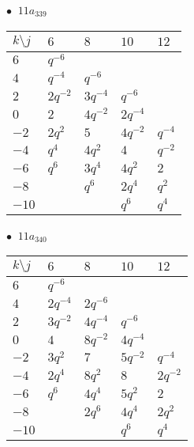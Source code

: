 \begin{minipage}{\linewidth}
$\bullet\ $ $11a_{339}$ \vspace{0.5em} \\
\begin{tabular}{l|llll}
$k \setminus j$ & $6$ & $8$ & $10$ & $12$ \\
\hline
$6$ & $q^{-6}$ &  &  &  \\
$4$ & $q^{-4}$ & $q^{-6}$ &  &  \\
$2$ & $2q^{-2}$ & $3q^{-4}$ & $q^{-6}$ &  \\
$0$ & $2$ & $4q^{-2}$ & $2q^{-4}$ &  \\
$-2$ & $2q^{2}$ & $5$ & $4q^{-2}$ & $q^{-4}$ \\
$-4$ & $q^{4}$ & $4q^{2}$ & $4$ & $q^{-2}$ \\
$-6$ & $q^{6}$ & $3q^{4}$ & $4q^{2}$ & $2$ \\
$-8$ &  & $q^{6}$ & $2q^{4}$ & $q^{2}$ \\
$-10$ &  &  & $q^{6}$ & $q^{4}$ \\
\end{tabular}
\vspace{2em}
\end{minipage}
%
\begin{minipage}{\linewidth}
$\bullet\ $ $11a_{340}$ \vspace{0.5em} \\
\begin{tabular}{l|llll}
$k \setminus j$ & $6$ & $8$ & $10$ & $12$ \\
\hline
$6$ & $q^{-6}$ &  &  &  \\
$4$ & $2q^{-4}$ & $2q^{-6}$ &  &  \\
$2$ & $3q^{-2}$ & $4q^{-4}$ & $q^{-6}$ &  \\
$0$ & $4$ & $8q^{-2}$ & $4q^{-4}$ &  \\
$-2$ & $3q^{2}$ & $7$ & $5q^{-2}$ & $q^{-4}$ \\
$-4$ & $2q^{4}$ & $8q^{2}$ & $8$ & $2q^{-2}$ \\
$-6$ & $q^{6}$ & $4q^{4}$ & $5q^{2}$ & $2$ \\
$-8$ &  & $2q^{6}$ & $4q^{4}$ & $2q^{2}$ \\
$-10$ &  &  & $q^{6}$ & $q^{4}$ \\
\end{tabular}
\vspace{2em}
\end{minipage}
%
